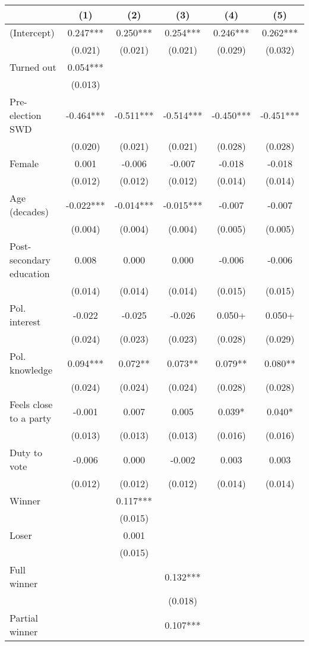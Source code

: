 \begin{table}
\centering
\begin{tabular}[t]{lccccc}
\toprule
  & (1) & (2) & (3) & (4) & (5)\\
\midrule
(Intercept) & 0.247*** & 0.250*** & 0.254*** & 0.246*** & 0.262***\\
 & (0.021) & (0.021) & (0.021) & (0.029) & (0.032)\\
Turned out & 0.054*** &  &  &  & \\
 & (0.013) &  &  &  & \\
Pre-election SWD & -0.464*** & -0.511*** & -0.514*** & -0.450*** & -0.451***\\
 & (0.020) & (0.021) & (0.021) & (0.028) & (0.028)\\
Female & 0.001 & -0.006 & -0.007 & -0.018 & -0.018\\
 & (0.012) & (0.012) & (0.012) & (0.014) & \vphantom{1} (0.014)\\
Age (decades) & -0.022*** & -0.014*** & -0.015*** & -0.007 & -0.007\\
 & (0.004) & (0.004) & (0.004) & (0.005) & (0.005)\\
Post-secondary education & 0.008 & 0.000 & 0.000 & -0.006 & -0.006\\
 & (0.014) & (0.014) & (0.014) & (0.015) & (0.015)\\
Pol. interest & -0.022 & -0.025 & -0.026 & 0.050+ & 0.050+\\
 & (0.024) & (0.023) & (0.023) & (0.028) & (0.029)\\
Pol. knowledge & 0.094*** & 0.072** & 0.073** & 0.079** & 0.080**\\
 & (0.024) & (0.024) & (0.024) & (0.028) & (0.028)\\
Feels close to a party & -0.001 & 0.007 & 0.005 & 0.039* & 0.040*\\
 & (0.013) & (0.013) & (0.013) & (0.016) & (0.016)\\
Duty to vote & -0.006 & 0.000 & -0.002 & 0.003 & 0.003\\
 & (0.012) & (0.012) & (0.012) & (0.014) & (0.014)\\
Winner &  & 0.117*** &  &  & \\
 &  & (0.015) &  &  \vphantom{1} & \\
Loser &  & 0.001 &  &  & \\
 &  & (0.015) &  &  & \\
Full winner &  &  & 0.132*** &  & \\
 &  &  & (0.018) &  & \\
Partial winner &  &  & 0.107*** &  & \\

\end{tabular}
\end{table}
